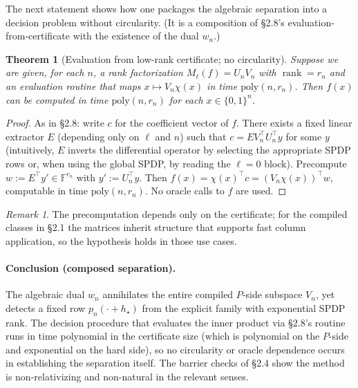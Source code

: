 \documentclass[12pt]{article}
\newtheorem{theorem}{Theorem}
\theoremstyle{definition}
\theoremstyle{definition}
\theoremstyle{remark}
\newtheorem{remark}{Remark}
\theoremstyle{remark}
\begin{document}
The next statement shows how one packages the algebraic separation into a decision problem without circularity. (It is a composition of \S2.8's evaluation-from-certificate with the existence of the dual $w_n$.)

\begin{theorem}[Evaluation from low-rank certificate; no circularity]\label{thm:eval-no-circularity}
Suppose we are given, for each $n$, a rank factorization $M_\ell(f)=U_n V_n$ with $\operatorname{rank}=r_n$ and an evaluation routine that maps $x\mapsto V_n\chi(x)$ in time $\mathrm{poly}(n,r_n)$. Then $f(x)$ can be computed in time $\mathrm{poly}(n,r_n)$ for each $x\in\{0,1\}^n$.
\end{theorem}

\begin{proof}
As in \S2.8: write $c$ for the coefficient vector of $f$. There exists a fixed linear extractor $E$ (depending only on $\ell$ and $n$) such that $c = E V_n^\top U_n^\top y$ for some $y$ (intuitively, $E$ inverts the differential operator by selecting the appropriate SPDP rows or, when using the global SPDP, by reading the $\ell=0$ block). Precompute $w := E^\top y'\in\mathbb{F}^{r_n}$ with $y':=U_n^\top y$. Then $f(x)=\chi(x)^\top c = (V_n\chi(x))^\top w$, computable in time $\mathrm{poly}(n,r_n)$. No oracle calls to $f$ are used.
\end{proof}

\begin{remark}
The precomputation depends only on the certificate; for the compiled classes in \S2.1 the matrices inherit structure that supports fast column application, so the hypothesis holds in those use cases.
\end{remark}

\paragraph{Conclusion (composed separation).}
The algebraic dual $w_n$ annihilates the entire compiled $P$-side subspace $V_n$, yet detects a fixed row $p_n(\cdot+h_\star)$ from the explicit family with exponential SPDP rank. The decision procedure that evaluates the inner product via \S2.8's routine runs in time polynomial in the certificate size (which is polynomial on the $P$-side and exponential on the hard side), so no circularity or oracle dependence occurs in establishing the separation itself. The barrier checks of \S2.4 show the method is non-relativizing and non-natural in the relevant senses.
\end{document}
